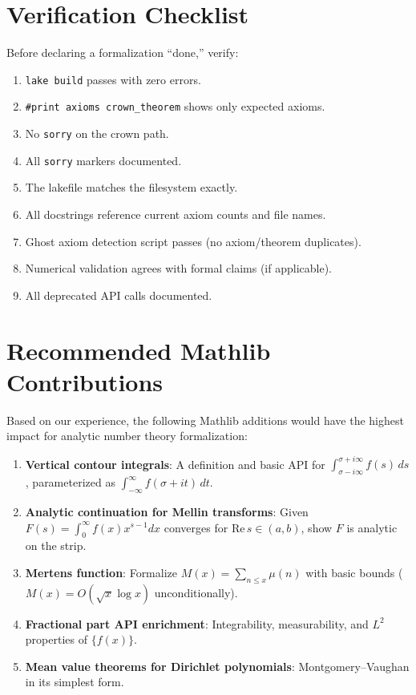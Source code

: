 \documentclass[11pt,a4paper]{article}
\newcommand{\lean}[1]{\texttt{#1}}
\begin{document}
\section{Verification Checklist}
\label{sec:checklist}

Before declaring a formalization ``done,'' verify:

\begin{enumerate}
  \item[$\square$] \lean{lake build} passes with zero errors.
  \item[$\square$] \lean{\#print axioms crown\_theorem} shows only
    expected axioms.
  \item[$\square$] No \lean{sorry} on the crown path.
  \item[$\square$] All \lean{sorry} markers documented.
  \item[$\square$] The lakefile matches the filesystem exactly.
  \item[$\square$] All docstrings reference current axiom counts
    and file names.
  \item[$\square$] Ghost axiom detection script passes (no axiom/theorem
    duplicates).
  \item[$\square$] Numerical validation agrees with formal claims (if
    applicable).
  \item[$\square$] All deprecated API calls documented.
\end{enumerate}

\section{Recommended Mathlib Contributions}
\label{sec:contributions}

Based on our experience, the following Mathlib additions would have
the highest impact for analytic number theory formalization:

\begin{enumerate}
  \item \textbf{Vertical contour integrals}: A definition and basic
    API for $\int_{\sigma-i\infty}^{\sigma+i\infty} f(s)\,ds$,
    parameterized as $\int_{-\infty}^{\infty} f(\sigma+it)\,dt$.
  \item \textbf{Analytic continuation for Mellin transforms}: Given
    $F(s) = \int_0^\infty f(x)x^{s-1}dx$ converges for
    $\mathrm{Re}\,s \in (a,b)$, show $F$ is analytic on the strip.
  \item \textbf{Mertens function}: Formalize $M(x) = \sum_{n \leq x}
    \mu(n)$ with basic bounds ($M(x) = O(\sqrt{x}\log x)$
    unconditionally).
  \item \textbf{Fractional part API enrichment}: Integrability,
    measurability, and $L^2$ properties of $\{f(x)\}$.
  \item \textbf{Mean value theorems for Dirichlet polynomials}:
    Montgomery--Vaughan in its simplest form.
\end{enumerate}
\end{document}

